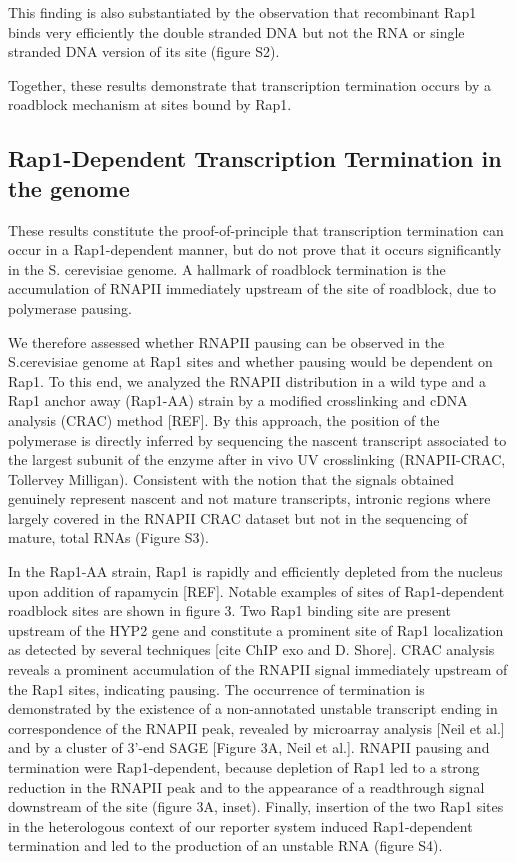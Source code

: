 This finding is also substantiated by the observation that recombinant Rap1 binds very efficiently the double stranded DNA but not the RNA or single stranded DNA version of its site (figure S2). 

Together, these results demonstrate that transcription termination occurs by a roadblock mechanism at sites bound by Rap1. 

\singlespacing
\subsection*{Rap1-Dependent Transcription Termination in the \cer{} genome}
\doublespacing

These results constitute the proof-of-principle that transcription termination can occur in a Rap1-dependent manner, but do not prove that it occurs significantly in the S. cerevisiae genome. A hallmark of roadblock termination is the accumulation of RNAPII immediately upstream of the site of roadblock, due to polymerase pausing. 

We therefore assessed whether RNAPII pausing can be observed in the S.cerevisiae genome   at Rap1 sites and whether pausing would be dependent on Rap1. To this end, we analyzed the RNAPII distribution in a wild type and a Rap1 anchor away (Rap1-AA) strain by a modified crosslinking and cDNA analysis (CRAC) method [REF]. By this approach, the position of the polymerase is directly inferred by sequencing the nascent transcript associated to the largest subunit of the enzyme after in vivo UV crosslinking (RNAPII-CRAC, Tollervey Milligan). Consistent with the notion that the signals obtained genuinely represent nascent and not mature transcripts, intronic regions where largely covered in the RNAPII CRAC dataset but not in the sequencing of mature, total RNAs (Figure S3).

In the Rap1-AA strain, Rap1 is rapidly and efficiently depleted from the nucleus upon addition of rapamycin [REF].  Notable examples of sites of Rap1-dependent roadblock sites are shown in figure 3. Two Rap1 binding site are present upstream of the HYP2 gene and constitute a prominent site of Rap1 localization as detected by several techniques [cite ChIP exo and D. Shore]. CRAC analysis reveals a prominent accumulation of the RNAPII signal immediately upstream of the Rap1 sites, indicating pausing. The occurrence of termination is demonstrated by the existence of a non-annotated unstable transcript ending in correspondence of the RNAPII peak, revealed by microarray analysis [Neil et al.] and by a cluster of 3’-end SAGE [Figure 3A, Neil et al.]. RNAPII pausing and termination were Rap1-dependent, because depletion of Rap1 led to a strong reduction in the RNAPII peak and to the appearance of a readthrough signal downstream of the site (figure 3A, inset). Finally, insertion of the two Rap1 sites in the heterologous context of our reporter system induced Rap1-dependent termination and led to the production of an unstable RNA (figure S4).

